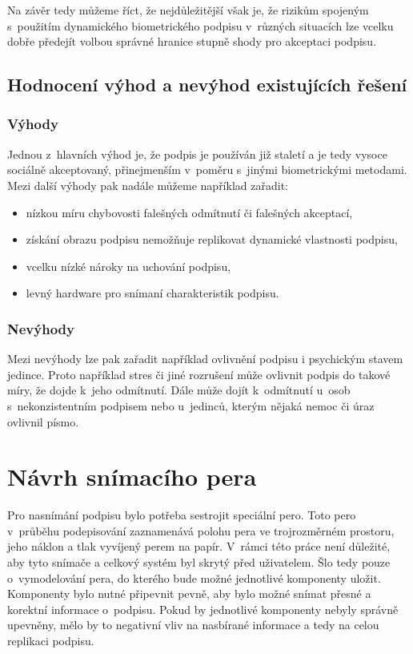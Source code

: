Na závěr tedy můžeme říct, že nejdůležitější však je, že rizikům spojeným s~použitím dynamického biometrického podpisu v~různých situacích lze vcelku dobře 
předejít volbou správné hranice stupně shody pro akceptaci podpisu.~\cite{8585636} %

\section{Hodnocení výhod a nevýhod existujících řešení}
\subsection*{Výhody}
Jednou z~hlavních výhod je, že podpis je používán již staletí a je tedy vysoce sociálně akceptovaný, přinejmenším v~poměru s~jinými biometrickými metodami.
Mezi další výhody pak nadále můžeme například zařadit:

\begin{itemize}
  \item nízkou míru chybovosti falešných odmítnutí či falešných akceptací,
  \item získání obrazu podpisu nemožňuje replikovat dynamické vlastnosti podpisu,
  \item vcelku nízké nároky na uchování podpisu,
  \item levný hardware pro snímaní charakteristik podpisu.
\end{itemize}

\subsection*{Nevýhody}
Mezi nevýhody lze pak zařadit například ovlivnění podpisu i psychickým stavem jedince.
Proto například stres či jiné rozrušení může ovlivnit podpis do takové míry, že dojde k~jeho odmítnutí.
Dále může dojít k~odmítnutí u~osob s~nekonzistentním podpisem nebo u~jedinců, kterým nějaká nemoc či úraz ovlivnil písmo.


\chapter{Návrh snímacího pera}
Pro nasnímání podpisu bylo potřeba sestrojit speciální pero.                                        %
Toto pero v~průběhu podepisování zaznamenává polohu pera ve trojrozměrném prostoru,                 %
jeho náklon a tlak vyvíjený perem na papír.                                                         %
V~rámci této práce není důležité, aby tyto snímače a celkový systém byl skrytý před uživatelem.     %
Šlo tedy pouze o~vymodelování pera, do kterého bude možné jednotlivé komponenty uložit.             %
Komponenty bylo nutné připevnit pevně, aby bylo možné snímat přesné a korektní informace o~podpisu. %
Pokud by jednotlivé komponenty nebyly správně upevněny,                                             %
mělo by to negativní vliv na nasbírané informace a tedy na celou replikaci podpisu.                 %

